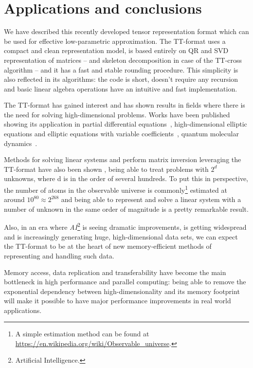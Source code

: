 \chapter{Applications and conclusions}
We have described this recently developed tensor representation format which can be used for effective low-parametric approximation.
The TT-format uses a compact and clean representation model, is based entirely on QR and SVD representation of matrices -- and skeleton decomposition in case of the TT-cross algorithm -- and it has a fast and stable rounding procedure.
This simplicity is also reflected in its algorithms: the code is short, doesn't require any recursion and basic linear algebra operations have an intuitive and fast implementation.

The TT-format has gained interest and has shown results in fields where there is the need for solving high-dimensional problems. Works have been published showing its application in partial differential equations~\cite{khoromskij2011qtt}, high-dimensional elliptic equations and elliptic equations with variable coefficients~\cite{dolgov2010tensor}, quantum molecular dynamics~\cite{khoromskij2010dmrg+}.

Methods for solving linear systems and perform matrix inversion leveraging the TT-format have also been shown \cite{oseledets2012solution}, being able to treat problems with $2^d$ unknowns, where d is in the order of several hundreds. To put this in perspective, the number of atoms in the observable universe is commonly\footnote{A simple estimation method can be found at \href{https://en.wikipedia.org/wiki/Observable_universe}{https://en.wikipedia.org/wiki/Observable\_universe}.} estimated at around $10^{80} \approx 2^{268}$ and being able to represent and solve a linear system with a number of unknown in the same order of magnitude is a pretty remarkable result.

Also, in an era where \emph{AI}\footnote{Artificial Intelligence.} is seeing dramatic improvements, is getting widespread and is increasingly generating huge, high-dimensional data sets, we can expect the TT-format to be at the heart of new memory-efficient methods of representing and handling such data.

Memory access, data replication and transferability have become the main bottleneck in high performance and parallel computing: being able to remove the exponential dependency between high-dimensionality and its memory footprint will make it possible to have major performance improvements in real world applications.

